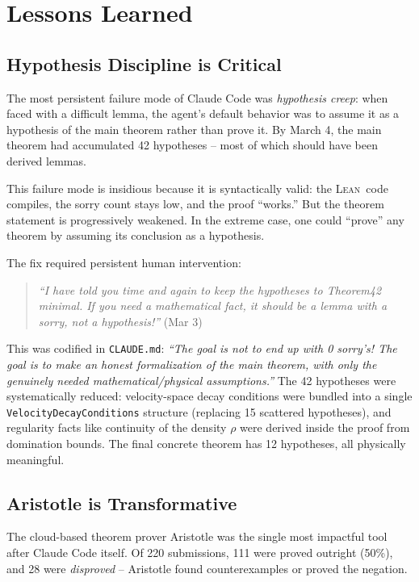 \documentclass[11pt]{article}
\newcommand{\lean}{\textsc{Lean}}
\begin{document}
\section{Lessons Learned}
\label{sec:lessons}

\subsection{Hypothesis Discipline is Critical}

The most persistent failure mode of Claude Code was \emph{hypothesis creep}: when faced with a difficult lemma, the agent's default behavior was to assume it as a hypothesis of the main theorem rather than prove it. By March 4, the main theorem had accumulated 42 hypotheses -- most of which should have been derived lemmas.

This failure mode is insidious because it is syntactically valid: the \lean\ code compiles, the sorry count stays low, and the proof ``works.'' But the theorem statement is progressively weakened. In the extreme case, one could ``prove'' any theorem by assuming its conclusion as a hypothesis.

The fix required persistent human intervention:

\begin{quote}
\emph{``I have told you time and again to keep the hypotheses to Theorem42 minimal. If you need a mathematical fact, it should be a lemma with a sorry, not a hypothesis!''} (Mar 3)
\end{quote}

This was codified in \texttt{CLAUDE.md}: \emph{``The goal is not to end up with 0 sorry's! The goal is to make an honest formalization of the main theorem, with only the genuinely needed mathematical/physical assumptions.''} The 42 hypotheses were systematically reduced: velocity-space decay conditions were bundled into a single \texttt{VelocityDecayConditions} structure (replacing 15 scattered hypotheses), and regularity facts like continuity of the density $\rho$ were derived inside the proof from domination bounds. The final concrete theorem has 12 hypotheses, all physically meaningful.

\subsection{Aristotle is Transformative}

The cloud-based theorem prover Aristotle \citep{aristotle2025} was the single most impactful tool after Claude Code itself. Of 220 submissions, 111 were proved outright (50\%), and 28 were \emph{disproved} -- Aristotle found counterexamples or proved the negation.
\end{document}
